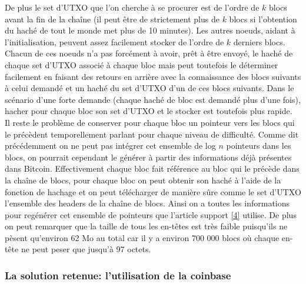 \documentclass[12pt,a4paper]{article}
\newcommand{\source}[1]{\hyperlink{#1}{[#1]}}
\begin{document}
De plus le set d'UTXO que l'on cherche à se procurer est de l'ordre de $k$ blocs avant la fin de la chaîne (il peut être de strictement plus de $k$ blocs si l'obtention du haché de tout le monde met plus de 10 minutes). Les autres noeuds, aidant à l'initialisation, peuvent assez facilement stocker de l'ordre de $k$ derniers blocs. Chacun de ces noeuds n'a pas forcément à avoir, prêt à être envoyé, le haché de chaque set d'UTXO associé à chaque bloc mais peut toutefois le déterminer facilement en faisant des retours en arrière avec la connaissance des blocs suivants à celui demandé et un haché du set d'UTXO d'un de ces blocs suivants. Dans le scénario d'une forte demande (chaque haché de bloc est demandé plus d'une fois), hacher pour chaque bloc son set d'UTXO et le stocker est toutefois plus rapide.\\ %

Il reste le problème de conserver pour chaque bloc un pointeur vers les blocs qui le précèdent temporellement parlant pour chaque niveau de difficulté. Comme dit précédemment on ne peut pas intégrer cet ensemble de log $n$ pointeurs dans les blocs, on pourrait cependant le générer à partir des informations déjà présentes dans Bitcoin. Effectivement chaque bloc fait référence au bloc qui le précède dans la chaîne de blocs, pour chaque bloc on peut obtenir son haché à l'aide de la fonction de hachage et on peut télécharger de manière sûre comme le set d'UTXO l'ensemble des headers de la chaîne de blocs. Ainsi on a toutes les informations pour regénérer cet ensemble de pointeurs que l'article support \source{4} utilise. De plus on peut remarquer que la taille de tous les en-têtes est très faible puisqu'ils ne pèsent qu'environ 62 Mo au total car il y a environ 700 000 blocs où chaque en-tête ne peut peser que jusqu'à 97 octets.\\ %

	\subsubsection{La solution retenue: l'utilisation de la coinbase} %
\end{document}

